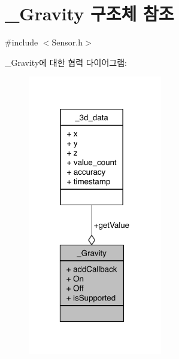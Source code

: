\hypertarget{struct___gravity}{\section{\-\_\-\-Gravity 구조체 참조}
\label{struct___gravity}
}


{\ttfamily \#include $<$Sensor.\-h$>$}



\-\_\-\-Gravity에 대한 협력 다이어그램\-:
\nopagebreak
\begin{figure}[H]
\begin{center}
\leavevmode
\includegraphics[width=166pt]{d5/d26/struct___gravity__coll__graph}
\end{center}
\end{figure}

